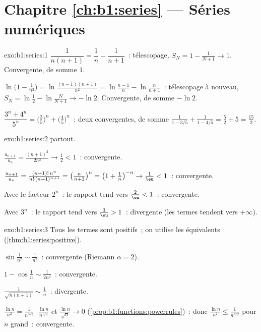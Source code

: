 \section*{Chapitre \ref{ch:b1:series} --- Séries numériques}

\begin{solution}{exo:b1:series:1}
$\dfrac{1}{n(n+1)} = \dfrac1n - \dfrac{1}{n+1}$~: télescopage, $S_N =
1 - \frac{1}{N+1} \to 1$. Convergente, de somme $1$.

$\ln\bigl(1 - \frac{1}{n^2}\bigr) = \ln\frac{(n-1)(n+1)}{n^2} =
\ln\frac{n-1}{n} - \ln\frac{n}{n+1}$~: télescopage à nouveau, $S_N =
\ln\frac12 - \ln\frac{N}{N+1} \to -\ln 2$. Convergente, de somme
$-\ln 2$.

$\dfrac{3^n + 4^n}{5^n} = \bigl(\frac35\bigr)^n +
\bigl(\frac45\bigr)^n$~: deux  convergentes, de
somme $\frac{1}{1 - 3/5} + \frac{1}{1 - 4/5} = \frac52 + 5 =
\frac{15}{2}$.
\end{solution}

\begin{solution}{exo:b1:series:2}
 partout.

$\frac{u_{n+1}}{u_n} = \frac{(n+1)^2}{2n^2} \to \frac12 < 1$~:
convergente.

$\frac{u_{n+1}}{u_n} = \frac{(n+1)!\,n^n}{n!\,(n+1)^{n+1}} =
\bigl(\frac{n}{n+1}\bigr)^n = \bigl(1 + \frac1n\bigr)^{-n} \to
\frac1\eu < 1$~: convergente.

Avec le facteur $2^n$~: le rapport tend vers $\frac2\eu < 1$~:
convergente.

Avec $3^n$~: le rapport tend vers $\frac3\eu > 1$~: divergente (les
termes tendent vers $+\infty$).
\end{solution}

\begin{solution}{exo:b1:series:3}
Tous les termes sont positifs~; on utilise les équivalents
(\cref{thm:b1:series:positive}).

$\sin\frac{1}{n^2} \sim \frac{1}{n^2}$~: convergente (Riemann $\alpha
= 2$).

$1 - \cos\frac1n \sim \frac{1}{2n^2}$~: convergente.

$\frac{1}{\sqrt{n(n+1)}} \sim \frac1n$~: divergente.

$\frac{\ln n}{n^2} = \frac{1}{n^{3/2}}\cdot\frac{\ln n}{n^{1/2}}$
et $\frac{\ln n}{\sqrt n} \to 0$
(\cref{prop:b1:functions:powerrules})~: donc $\frac{\ln n}{n^2} \leq
\frac{1}{n^{3/2}}$ pour $n$ grand~: convergente.
\end{solution}

